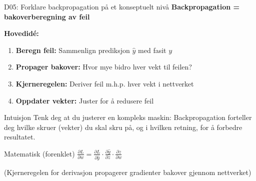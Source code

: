 \documentclass[aspectratio=169, 10pt]{beamer}
\begin{document}
\begin{frame}{D05: Forklare backpropagation på et konseptuelt nivå}
    \textbf{Backpropagation = bakoverberegning av feil}
    
    \vspace{0.3cm}
    \textbf{Hovedidé:}
    \begin{enumerate}
        \item \textbf{Beregn feil:} Sammenlign prediksjon $\hat{y}$ med fasit $y$
        \item \textbf{Propager bakover:} Hvor mye bidro hver vekt til feilen?
        \item \textbf{Kjerneregelen:} Deriver feil m.h.p. hver vekt i nettverket
        \item \textbf{Oppdater vekter:} Juster for å redusere feil
    \end{enumerate}
    
    \vspace{0.3cm}
    \begin{alertblock}{Intuisjon}
        Tenk deg at du justerer en kompleks maskin: Backpropagation forteller deg hvilke skruer (vekter) du skal skru på, og i hvilken retning, for å forbedre resultatet.
    \end{alertblock}
    
    \vspace{0.3cm}
    \begin{block}{Matematisk (forenklet)}
        $\frac{\partial L}{\partial w} = \frac{\partial L}{\partial \hat{y}} \cdot \frac{\partial \hat{y}}{\partial z} \cdot \frac{\partial z}{\partial w}$
        
        \small (Kjerneregelen for derivasjon propagerer gradienter bakover gjennom nettverket)
    \end{block}
\end{frame}
\end{document}
